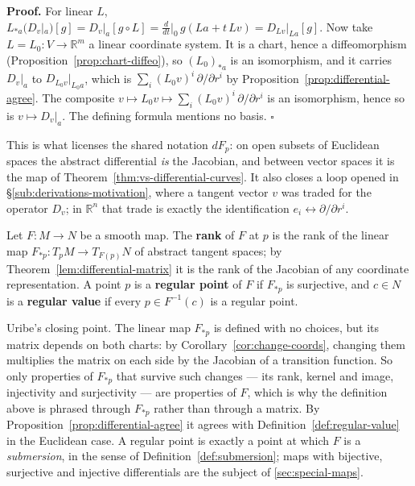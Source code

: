 \documentclass[11pt]{report}
\makeatletter
\newcounter{defcounter}[section]
\renewenvironment{proof}[1][Proof]{\noindent\textbf{#1.} }{\hfill$\square$\par\vspace{5pt}}
\newcommand{\deflabel}[1]{\edef\@currentlabel{\arabic{section}.\arabic{defcounter}}\label{#1}}
\newcommand{\leeref}[1]{\par\smallskip{\raggedleft\footnotesize\textsc{Lee}:\ #1\par}}
\makeatother
\begin{document}
\begin{proof}
For linear $L$, $L_{*a}(D_v|_a)[g] = D_v|_a[g \circ L] = \frac{d}{dt}\big|_0\, g(La + t\,Lv) = D_{Lv}|_{La}[g]$. Now take $L = L_0 : V \to \mathbb{R}^m$ a linear coordinate system. It is a chart, hence a diffeomorphism (Proposition~\ref{prop:chart-diffeo}), so $(L_0)_{*a}$ is an isomorphism, and it carries $D_v|_a$ to $D_{L_0 v}|_{L_0 a}$, which is $\sum_i (L_0 v)^i\,\partial/\partial r^i$ by Proposition~\ref{prop:differential-agree}. The composite $v \mapsto L_0 v \mapsto \sum_i (L_0v)^i\,\partial/\partial r^i$ is an isomorphism, hence so is $v \mapsto D_v|_a$. The defining formula mentions no basis.
\end{proof}

\begin{rembox}\label{rem:abstract-tangent-8}
This is what licenses the shared notation $dF_p$: on open subsets of Euclidean spaces the abstract differential \emph{is} the Jacobian, and between vector spaces it is the map of Theorem~\ref{thm:vs-differential-curves}. It also closes a loop opened in \S\ref{sub:derivations-motivation}, where a tangent vector $v$ was traded for the operator $D_v$; in $\mathbb{R}^n$ that trade is exactly the identification $e_i \leftrightarrow \partial/\partial r^i$.
\end{rembox}

\begin{defbox}\deflabel{def:manifold-regular}
Let $F : M \to N$ be a smooth map. The \textbf{rank} of $F$ at $p$ is the rank of the linear map $F_{*p} : T_pM \to T_{F(p)}N$ of abstract tangent spaces; by Theorem~\ref{lem:differential-matrix} it is the rank of the Jacobian of any coordinate representation. A point $p$ is a \textbf{regular point} of $F$ if $F_{*p}$ is surjective, and $c \in N$ is a \textbf{regular value} if every $p \in F^{-1}(c)$ is a regular point.
\leeref{Ch.~4 and Ch.~5, p.~105}
\end{defbox}

\begin{rembox}\label{rem:map-intrinsic-matrix-not}
Uribe's closing point. The linear map $F_{*p}$ is defined with no choices, but its matrix depends on both charts: by Corollary~\ref{cor:change-coords}, changing them multiplies the matrix on each side by the Jacobian of a transition function. So only properties of $F_{*p}$ that survive such changes --- its rank, kernel and image, injectivity and surjectivity --- are properties of $F$, which is why the definition above is phrased through $F_{*p}$ rather than through a matrix. By Proposition~\ref{prop:differential-agree} it agrees with Definition~\ref{def:regular-value} in the Euclidean case. A regular point is exactly a point at which $F$ is a \emph{submersion}, in the sense of Definition~\ref{def:submersion}; maps with bijective, surjective and injective differentials are the subject of \ref{sec:special-maps}.
\end{rembox}
\end{document}
